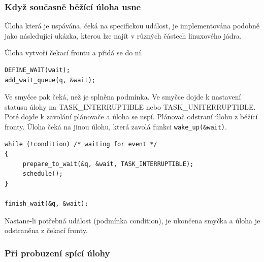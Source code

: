 \documentclass[
  field=ainfk,
  biblatex,
  glossaries,
  index
]{kidiplom}
\begin{document}
%
\subsubsection{Když současně běžící úloha usne}

Úloha která je uspávána, čeká na specifickou událost, je implementována podobně jako následující ukázka, kterou lze najít v různých částech linuxového jádra.

%
Úloha vytvoří čekací frontu a přidá se do ní. 
\nopagebreak
\begin{verbatim}
DEFINE_WAIT(wait);
add_wait_queue(q, &wait);
\end{verbatim}
Ve smyčce pak čeká, než je splněna podmínka. Ve smyčce dojde k nastavení statusu úlohy na TASK\_INTERRUPTIBLE nebo TASK\_UNITERRUPTIBLE. Poté dojde k zavolání plánovače a úloha se uspí. Plánovač odstraní úlohu z běžící fronty. Úloha čeká na jinou úlohu, která zavolá funkci \verb#wake_up(&wait)#.
 
\begin{verbatim}
while (!condition) /* waiting for event */
{ 
     prepare_to_wait(&q, &wait, TASK_INTERRUPTIBLE); 
     schedule(); 
} 

finish_wait(&q, &wait);
\end{verbatim}

Nastane-li potřebná událost (podmínka condition), je ukončena smyčka a úloha je odstraněna z čekací fronty. 

\subsubsection{Při probuzení spící úlohy}

\end{document}

